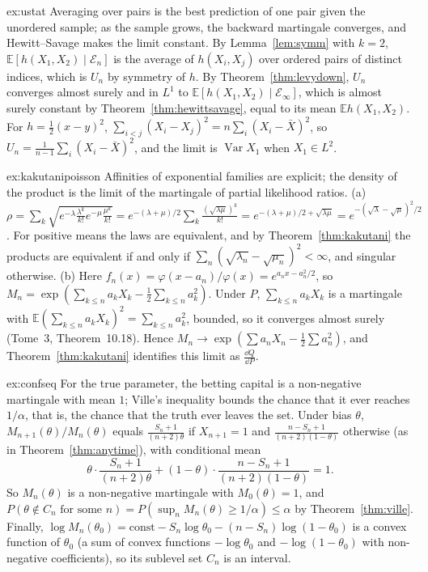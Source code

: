 \begin{solution}{ex:ustat}
\idea Averaging over pairs is the best prediction of one pair given the unordered sample; as the sample grows, the backward martingale converges, and Hewitt--Savage makes the limit constant.
\writeup By Lemma~\ref{lem:symm} with $k=2$, $\mathbb E[h(X_1,X_2)\mid\mathcal E_n]$ is the average of $h(X_i,X_j)$ over ordered pairs of distinct indices, which is $U_n$ by symmetry of $h$. By Theorem~\ref{thm:levydown}, $U_n$
converges almost surely and in $L^1$ to $\mathbb E[h(X_1,X_2)\mid\mathcal E_\infty]$, which is almost surely constant by Theorem~\ref{thm:hewittsavage}, equal to its mean $\mathbb Eh(X_1,X_2)$. For
$h=\frac12(x-y)^2$, $\sum_{i<j}(X_i-X_j)^2=n\sum_i(X_i-\bar X)^2$, so $U_n=\frac1{n-1}\sum_i(X_i-\bar X)^2$, and the limit is $\operatorname{Var}X_1$ when $X_1\in L^2$.
\end{solution}

\begin{solution}{ex:kakutanipoisson}
\idea Affinities of exponential families are explicit; the density of the product is the limit of the martingale of partial likelihood ratios.
\writeup (a) $\rho=\sum_k\sqrt{e^{-\lambda}\frac{\lambda^k}{k!}e^{-\mu}\frac{\mu^k}{k!}}=e^{-(\lambda+\mu)/2}\sum_k\frac{(\sqrt{\lambda\mu})^k}{k!}=e^{-(\lambda+\mu)/2+\sqrt{\lambda\mu}}=e^{-(\sqrt\lambda-\sqrt\mu)^2/2}$. For positive means the laws are equivalent,
and by Theorem~\ref{thm:kakutani} the products are equivalent if and only if $\sum_n(\sqrt{\lambda_n}-\sqrt{\mu_n})^2<\infty$, and singular otherwise.
(b) Here $f_n(x)=\varphi(x-a_n)/\varphi(x)=e^{a_nx-a_n^2/2}$, so $M_n=\exp(\sum_{k\le n}a_kX_k-\frac12\sum_{k\le n}a_k^2)$. Under $P$, $\sum_{k\le n}a_kX_k$ is a martingale with
$\mathbb E(\sum_{k\le n}a_kX_k)^2=\sum_{k\le n}a_k^2$, bounded, so it converges almost surely (Tome~3, Theorem~10.18). Hence $M_n\to\exp(\sum a_nX_n-\frac12\sum a_n^2)$, and Theorem~\ref{thm:kakutani} identifies this limit as
$\frac{\dd Q}{\dd P}$.
\end{solution}

\begin{solution}{ex:confseq}
\idea For the true parameter, the betting capital is a non-negative martingale with mean $1$; Ville's inequality bounds the chance that it ever reaches $1/\alpha$, that is, the chance that the truth ever leaves the set.
\writeup Under bias $\theta$, $M_{n+1}(\theta)/M_n(\theta)$ equals $\frac{S_n+1}{(n+2)\theta}$ if $X_{n+1}=1$ and $\frac{n-S_n+1}{(n+2)(1-\theta)}$ otherwise (as in Theorem~\ref{thm:anytime}), with conditional mean
\[
\theta\cdot\frac{S_n+1}{(n+2)\theta}+(1-\theta)\cdot\frac{n-S_n+1}{(n+2)(1-\theta)}=1.
\]
So $M_n(\theta)$ is a non-negative martingale with $M_0(\theta)=1$, and $P(\theta\notin C_n\text{ for some }n)=P(\sup_nM_n(\theta)\ge1/\alpha)\le\alpha$ by Theorem~\ref{thm:ville}. Finally,
$\log M_n(\theta_0)=\text{const}-S_n\log\theta_0-(n-S_n)\log(1-\theta_0)$ is a convex function of $\theta_0$ (a sum of convex functions $-\log\theta_0$ and $-\log(1-\theta_0)$ with non-negative coefficients), so its sublevel set
$C_n$ is an interval.
\end{solution}

